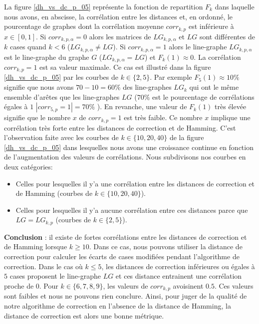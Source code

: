 La figure \ref{dh_vs_dc_p_05} repr\'esente la fonction de repartition $F_k$ dans laquelle nous avons, en abscisse, la corr\'elation entre les distances et, en ordonn\'e, le pourcentage de graphes dont la corr\'elation moyenne $corr_{k,p}$ est inf\'erieure \`a $x \in [0,1]$. 
Si $corr_{k,p,\alpha} = 0$ alors les matrices de $LG_{k,p,\alpha}$ et $LG$ sont diff\'erentes de $k$ cases quand $k < 6$ ($LG_{k,p,\alpha} \neq LG$).
Si $corr_{k,p,\alpha} = 1$ alors le line-graphe $LG_{k, p, \alpha}$ est le line-graphe du graphe $G$ ($LG_{k, p, \alpha} = LG$) et $F_k(1) \approx 0$. 
La corr\'elation $corr_{k,p} = 1$ est sa valeur maximale. 
Ce cas est illustr\'e dans la figure \ref{dh_vs_dc_p_05} par les courbes de $k \in \{2,5\}$. 
Par exemple $F_5(1) \approx 10\%$ signifie que nous avons $70-10=60\%$ des line-graphes $LG_k$ qui ont le m\^eme ensemble d'ar\^etes que les line-graphes $LG$ ($70\%$ est le pourcentage de corr\'elations \'egales \`a $1$ $|corr_{5,p} = 1 | = 70\%$ ).
\newline
En revanche, une valeur de $F_k(1)$ tr\`es \'elev\'ee signifie que le nombre $x$ de  $corr_{k,p} = 1$ est tr\`es faible. Ce nombre $x$ implique une corr\'elation tr\`es forte entre les distances de correction et de Hamming.
C'est l'observation faite avec les courbes de $k \in \{10,20,40\}$ de la figure \ref{dh_vs_dc_p_05} dans lesquelles nous avons une  croissance continue en fonction de l'augmentation des valeurs de corr\'elations.
\newline
Nous subdivisons nos courbes en deux cat\'egories:
\begin{itemize}
	\item Celles pour lesquelles il y'a une corr\'elation entre les distances de correction et de Hamming (courbes de $k \in \{10,20,40\}$).
	\item Celles pour lesquelles il y'a  aucune corr\'elation entre ces distances parce que   $LG = LG_{k,p}$ (courbes de $k \in \{2,5\}$). 
\end{itemize}


{\bf Conclusion} :
il existe de fortes corr\'elations entre les distances de correction et de Hamming lorsque $k \ge 10$. Dans ce cas, nous pouvons utiliser la distance de correction pour calculer les \'ecarts de cases modifi\'ees pendant l'algorithme de correction.
Dans le cas o\`u $k \le 5$, les distances de correction inf\'erieures ou \'egales \`a $5$ cases proposent le line-graphe $LG$ et ces distance entrainent une corr\'elation proche de $0$.
Pour  $k \in \{6,7,8,9\}$, les valeurs de $corr_{k,p}$ avoisinent $0.5$. Ces valeurs sont faibles et nous ne pouvons rien conclure.
Ainsi, pour juger de la qualit\'e de notre algorithme de correction en l'absence de la distance de Hamming, la distance de correction est alors une bonne m\'etrique.
